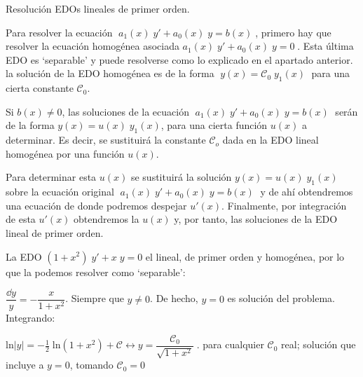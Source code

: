 \begin{teor}{Resolución EDOs lineales de primer orden.}

Para resolver la ecuación $\; a_1(x)\; y' +a_0(x)\; y = b(x)\; $, primero hay que resolver la ecuación homogénea asociada $a_1(x)\; y' +a_0(x)\; y = 0\; $. Esta última EDO es `separable' y puede resolverse como lo explicado en el apartado anterior. la solución de la EDO homogénea es de la forma $\; y(x)=\mathcal{C}_0\; y_1(x)\;$ para una cierta constante $\mathcal{C}_0$.

Si $b(x) \neq 0$, las soluciones de la ecuación  $\; a_1(x)\; y' +a_0(x)\; y = b(x)\; $ serán de la forma $y(x)=u(x)\; y_1(x)$, para una cierta función $u(x)$ a determinar. Es decir, se sustituirá la constante $\mathcal{C}_o$ dada en la EDO lineal homogénea por una función $u(x)$.

Para determinar esta  $u(x)$ se sustituirá la solución $y(x)=u(x)\; y_1(x)$ sobre la ecuación original $\; a_1(x)\; y' +a_0(x)\; y = b(x)\; $ y de ahí obtendremos una ecuación de donde podremos despejar $u'(x)$. Finalmente, por integración de esta $u'(x)$ obtendremos la  $u(x)$ y, por tanto, las soluciones de la EDO lineal de primer orden. 	
\end{teor}


\begin{ejem}
	La EDO $(1+x^2)\; y' + x\; y = 0$ el lineal, de primer orden y homogénea, por lo que la podemos resolver como `separable':
	
	$\dfrac {\dd y}{y }=-\dfrac {x}{1+x^2}$. Siempre que $y \neq 0$. De hecho, $y=0$ es solución del problema. Integrando:
	
	$\mathrm{ln} |y|=-\frac 1 2 \; \mathrm{ln} (1+x^2)+\mathcal{C} \leftrightarrow y=\dfrac {\mathcal{C}_0}{\sqrt{1+x^2}}\;$. para cualquier $\mathcal{C}_0$ real; solución que incluye a $y=0$, tomando $\mathcal{C}_0=0$
\end{ejem}



